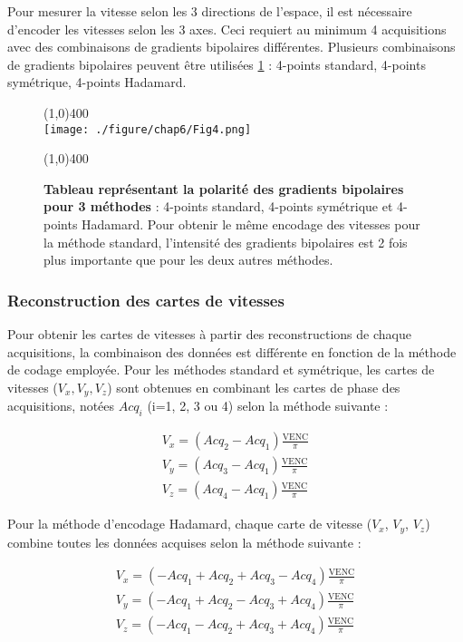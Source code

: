 Pour mesurer la vitesse selon les 3 directions de l'espace, il est nécessaire d'encoder les vitesses selon les 3 axes. Ceci requiert au minimum 4 acquisitions avec des combinaisons de gradients bipolaires différentes. Plusieurs combinaisons de gradients bipolaires peuvent être utilisées \ref{fig:EncFlux} : 4-points standard, 4-points symétrique, 4-points Hadamard. 

\begin{figure}[H]
\centering
\line(1,0){400} \\
\texttt{[image: ./figure/chap6/Fig4.png]}
\caption[Présentation de 3 méthode d'encodage de flux.]{\label{fig:EncFlux} \textbf{Tableau représentant la polarité des gradients bipolaires pour 3 méthodes} : 4-points standard, 4-points symétrique et 4-points Hadamard. Pour obtenir le même encodage des vitesses pour la méthode standard, l'intensité des gradients bipolaires est 2 fois plus importante que pour les deux autres méthodes.}
\line(1,0){400} \\ 
\end{figure}

\subsubsection{Reconstruction des cartes de vitesses}

Pour obtenir les cartes de vitesses à partir des reconstructions de chaque acquisitions, la combinaison des données est différente en fonction de la méthode de codage employée. Pour les méthodes standard et symétrique, les cartes de vitesses ($V_x,V_y,V_z$) sont obtenues en combinant les cartes de phase des acquisitions, notées $Acq_i$ (i=1, 2, 3 ou 4) selon la méthode suivante :

\begin{equation}
\begin{split}
V_x = (Acq_2-Acq_1) \frac{\text{VENC}}{\pi} \\
V_y = (Acq_3-Acq_1 ) \frac{\text{VENC}}{\pi}\\
V_z = (Acq_4-Acq_1 ) \frac{\text{VENC}}{\pi}
\end{split}
\end{equation}

Pour la méthode d’encodage Hadamard, chaque carte de vitesse ($V_x$, $V_y$, $V_z$) combine toutes les données acquises selon la méthode suivante : 

\begin{equation}
\begin{split}
V_x = (-Acq_1+Acq_2+Acq_3-Acq_4) \frac{\text{VENC}}{\pi} \\
V_y = (-Acq_1+Acq_2-Acq_3+Acq_4 ) \frac{\text{VENC}}{\pi}\\
V_z = (-Acq_1-Acq_2+Acq_3+Acq_4 ) \frac{\text{VENC}}{\pi}
\end{split}
\end{equation}

